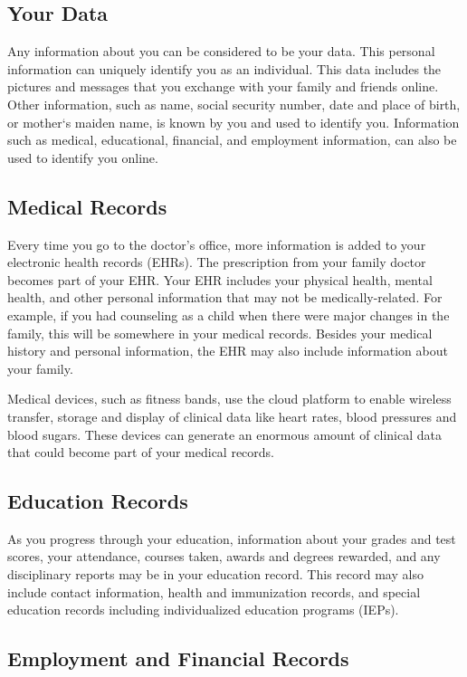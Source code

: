 \documentclass{article}
\begin{document}
\subsection{Your Data}

Any information about you can be considered to be your data. This personal information can uniquely identify you as an individual. This data includes the pictures and messages that you exchange with your family and friends online. Other information, such as name, social security number, date and place of birth, or mother‘s maiden name, is known by you and used to identify you. Information such as medical, educational, financial, and employment information, can also be used to identify you online.

\subsection*{Medical Records}

Every time you go to the doctor’s office, more information is added to your electronic health records (EHRs). The prescription from your family doctor becomes part of your EHR. Your EHR includes your physical health, mental health, and other personal information that may not be medically-related. For example, if you had counseling as a child when there were major changes in the family, this will be somewhere in your medical records. Besides your medical history and personal information, the EHR may also include information about your family.

Medical devices, such as fitness bands, use the cloud platform to enable wireless transfer, storage and display of clinical data like heart rates, blood pressures and blood sugars. These devices can generate an enormous amount of clinical data that could become part of your medical records.

\subsection*{Education Records}

As you progress through your education, information about your grades and test scores, your attendance, courses taken, awards and degrees rewarded, and any disciplinary reports may be in your education record. This record may also include contact information, health and immunization records, and special education records including individualized education programs (IEPs).
\subsection*{Employment and Financial Records}
\end{document}
